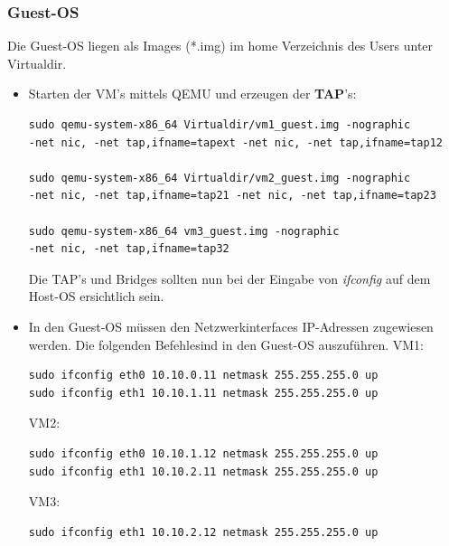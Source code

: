 \documentclass[a4,12pt]{scrartcl}
\begin{document}
\subsubsection{Guest-OS}
Die Guest-OS liegen als Images (*.img) im home Verzeichnis des Users unter Virtualdir. 
\begin{itemize}
\item Starten der VM's mittels QEMU und erzeugen der \textbf{TAP}'s:
\begin{lstlisting}
sudo qemu-system-x86_64 Virtualdir/vm1_guest.img -nographic 
-net nic, -net tap,ifname=tapext -net nic, -net tap,ifname=tap12

sudo qemu-system-x86_64 Virtualdir/vm2_guest.img -nographic
-net nic, -net tap,ifname=tap21 -net nic, -net tap,ifname=tap23

sudo qemu-system-x86_64 vm3_guest.img -nographic
-net nic, -net tap,ifname=tap32
\end{lstlisting}
Die TAP's und Bridges sollten nun bei der Eingabe von \textit{ifconfig} auf dem Host-OS ersichtlich sein.

\item In den Guest-OS müssen den Netzwerkinterfaces IP-Adressen zugewiesen werden. Die folgenden Befehlesind in den Guest-OS auszuführen.
\newline
VM1:
\begin{lstlisting}
sudo ifconfig eth0 10.10.0.11 netmask 255.255.255.0 up
sudo ifconfig eth1 10.10.1.11 netmask 255.255.255.0 up
\end{lstlisting}
VM2:
\begin{lstlisting}
sudo ifconfig eth0 10.10.1.12 netmask 255.255.255.0 up
sudo ifconfig eth1 10.10.2.11 netmask 255.255.255.0 up
\end{lstlisting}
VM3:
\begin{lstlisting}
sudo ifconfig eth1 10.10.2.12 netmask 255.255.255.0 up
\end{lstlisting}
\end{itemize}
\end{document}
